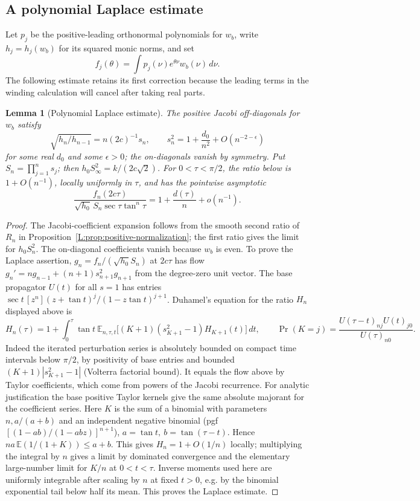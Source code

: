 \documentclass[11pt]{article}
\numberwithin{equation}{section}
\newtheorem{lemma}[theorem]{Lemma}
\theoremstyle{definition}\newtheorem{definition}[theorem]{Definition}
\theoremstyle{remark}\newtheorem{remark}[theorem]{Remark}
\begin{document}
\subsection{A polynomial Laplace estimate}
Let $p_j$ be the positive-leading orthonormal polynomials for $w_b$, write
$h_j=h_j(w_b)$ for its squared monic norms, and set
\[
 f_j(\theta)=\int p_j(\nu)e^{\theta\nu}w_b(\nu)\,d\nu.
\]
The following estimate retains its first correction because the leading
terms in the winding calculation will cancel after taking real parts.

\begin{lemma}[Polynomial Laplace estimate]\label{L:lem:polynomial-laplace}
The positive Jacobi off-diagonals for \(w_b\) satisfy
\[
 \sqrt{h_n/h_{n-1}}= n(2c)^{-1} s_n,\qquad s_n^2=1+\frac{d_0}{n^2}+O(n^{-2-\epsilon})
\]
for some real \(d_0\) and some \(\epsilon>0\); the on-diagonals vanish by symmetry. Put \(S_n=\prod_{j=1}^n s_j\); then \(h_0 S_\infty^2=k/(2c\sqrt2)\).
For $0<\tau<\pi/2$, the ratio below is $1+O(n^{-1})$, locally uniformly
in $\tau$, and has the pointwise asymptotic
\begin{equation}\label{L:eq:laplace-correction}
 \frac{f_n(2c\tau)}{\sqrt{h_0}\, S_n \sec\tau\tan^n\tau}
       =1+\frac{d(\tau)}{n}+o(n^{-1}).
\end{equation}
\end{lemma}
\begin{proof}
The Jacobi-coefficient expansion follows from the smooth second ratio of
$R_n$ in Proposition~\ref{L:prop:positive-normalization}; the first ratio
gives the limit for $h_0S_n^2$. The on-diagonal coefficients vanish because
$w_b$ is even. To prove the Laplace assertion, \(g_n=f_n/(\sqrt{h_0} S_n)\) at \(2c\tau\) has flow \(g_n'=n g_{n-1}+(n+1)s_{n+1}^2 g_{n+1}\) from the degree-zero unit vector. The base propagator \(U(t)\) for all \(s=1\) has entries \(\sec t\,[z^n](z+\tan t)^j/(1-z\tan t)^{j+1}\). Duhamel's equation for the ratio \(H_n\) displayed above is
\[
 H_n(\tau)=1+\int_0^\tau \tan t\
  \mathbb E_{n,\tau,t}\big[(K+1)(s_{K+1}^2-1)H_{K+1}(t)\big]\,dt ,
 \qquad
 \Pr(K=j)=\frac{U(\tau-t)_{nj}U(t)_{j0}}{U(\tau)_{n0}}.
\]
Indeed the iterated perturbation series is absolutely bounded on compact time intervals below \(\pi/2\), by positivity of base entries and bounded \((K+1)|s_{K+1}^2-1|\) (Volterra factorial bound). It equals the flow above by Taylor coefficients, which come from powers of the Jacobi recurrence. For analytic justification the base positive Taylor kernels give the same absolute majorant for the coefficient series. Here \(K\) is the sum of a binomial with parameters \(n,a/(a+b)\) and an independent negative binomial (pgf \([(1-ab)/(1-abz)]^{n+1}\)), \(a=\tan t,\ b=\tan(\tau-t)\). Hence \(n a\,\mathbb E(1/(1+K))\le a+b\). This gives \(H_n=1+O(1/n)\) locally; multiplying the integral by \(n\) gives a limit by dominated convergence and the elementary large-number limit for \(K/n\) at \(0<t<\tau\). Inverse moments used here are uniformly integrable after scaling by \(n\) at fixed \(t>0\), e.g. by the binomial exponential tail below half its mean. This proves the Laplace estimate.
\end{proof}
\end{document}
